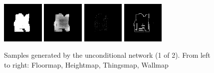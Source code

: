 \begin{figure}[h!]
\begin{minipage}[b]{\linewidth}
	\begin{center}
		\includegraphics[width=2cm]{figures/results/samples/uncond/sample28_map_floormap_generated.png}
		\includegraphics[width=2cm]{figures/results/samples/uncond/sample28_map_heightmap_generated.png}
		\includegraphics[width=2cm]{figures/results/samples/uncond/sample28_map_thingsmap_generated.png}
		\includegraphics[width=2cm]{figures/results/samples/uncond/sample28_map_wallmap_generated.png}
	\end{center}
	

	
\end{minipage}
\caption[Samples Generated by the Unconditional network (1 of 2)]{Samples generated by the unconditional network (1 of 2). From left to right: Floormap, Heightmap, Thingsmap, Wallmap}
\label{fig:samples-uncond-1}
\end{figure}
